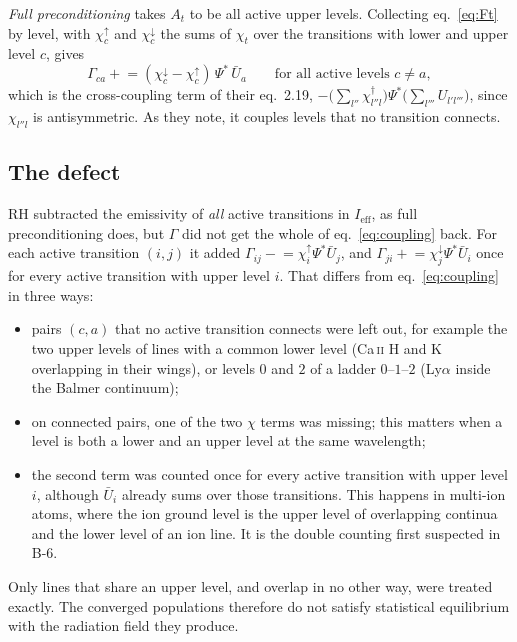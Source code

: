 \documentclass[11pt,a4paper]{article}
\begin{document}
\emph{Full preconditioning} \citep[\S2.3]{1992A&A...262..209R} takes
$A_t$ to be all active upper levels. Collecting eq.~\eqref{eq:Ft} by level,
with $\chi^\uparrow_c$ and $\chi^\downarrow_c$ the sums of $\chi_t$ over
the transitions with lower and upper level $c$, gives
\begin{equation}
  \Gamma_{ca} \mathrel{+}= (\chi^\downarrow_c - \chi^\uparrow_c)\,
  \Psi^*\,\bar U_a \qquad\text{for all active levels } c \ne a ,
  \label{eq:coupling}
\end{equation}
which is the cross-coupling term of their eq.~2.19,
$-\bigl(\sum_{l''}\chi^\dagger_{l''l}\bigr)\Psi^*\bigl(\sum_{l'''}U_{l'l'''}\bigr)$,
since $\chi_{l''l}$ is antisymmetric. As they note, it couples levels that
no transition connects.

\subsection{The defect}
RH subtracted the emissivity of \emph{all} active transitions in
$I_\text{eff}$, as full preconditioning does, but $\Gamma$ did not get the
whole of eq.~\eqref{eq:coupling} back. For each active transition $(i,j)$ it
added $\Gamma_{ij}\mathrel{-}=\chi^\uparrow_i\Psi^*\bar U_j$, and
$\Gamma_{ji}\mathrel{+}=\chi^\downarrow_j\Psi^*\bar U_i$ once for every active
transition with upper level $i$. That differs from eq.~\eqref{eq:coupling}
in three ways:
\begin{itemize}
\item pairs $(c,a)$ that no active transition connects were left out,
  for example the two upper levels of lines with a common lower level
  (Ca\,\textsc{ii} H and K overlapping in their wings), or levels $0$ and
  $2$ of a ladder $0$--$1$--$2$ (Ly$\alpha$ inside the Balmer continuum);
\item on connected pairs, one of the two $\chi$ terms was missing; this
  matters when a level is both a lower and an upper level at the same
  wavelength;
\item the second term was counted once for every active transition with
  upper level $i$, although $\bar U_i$ already sums over those
  transitions. This happens in multi-ion atoms, where the ion ground
  level is the upper level of overlapping continua and the lower level
  of an ion line. It is the double counting first suspected in B-6.
\end{itemize}
Only lines that share an upper level, and overlap in no other way,
were treated exactly. The converged populations therefore do not
satisfy statistical equilibrium with the radiation field they produce.
\end{document}
